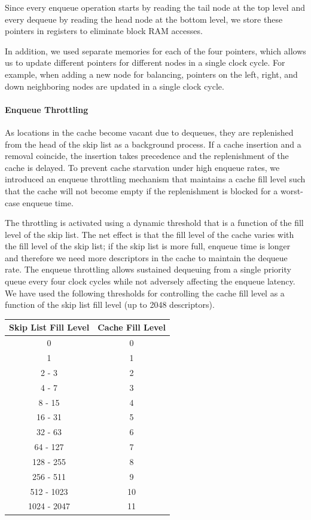 Since every enqueue operation starts by reading the tail node at the top level and every dequeue by reading the head node at the bottom level, we store these pointers in registers to eliminate block RAM accesses.

In addition, we used separate memories for each of the four pointers, which allows us to update different pointers for different nodes in a single clock cycle.  For example, when adding a new node for balancing, pointers on the left, right, and down neighboring nodes are updated in a single clock cycle.

\paragraph{Enqueue Throttling}\label{enq-throttle}
As locations in the cache become vacant due to dequeues, they are replenished from the head of the skip list as a background process.  If a cache insertion and a removal coincide, the insertion takes precedence and the replenishment of the cache is delayed.  To prevent cache starvation under high enqueue rates, we introduced an enqueue throttling mechanism that maintains a cache fill level such that the cache will not become empty if the replenishment is blocked for a worst-case enqueue time.  

The throttling is activated using a dynamic threshold that is a function of the fill level of the skip list.  The net effect is that the fill level of the cache varies with the fill level of the skip list; if the skip list is more full, enqueue time is longer and therefore we need more descriptors in the cache to maintain the dequeue rate.  The enqueue throttling allows sustained dequeuing from a single priority queue every four clock cycles while not adversely affecting the enqueue latency. We have used the following thresholds for controlling the cache fill level as a function of the skip list fill level (up to 2048 descriptors).

\begin{center}
\begin{tabular}{|c|c|}
    \hline
    \textbf{Skip List Fill Level} & \textbf{Cache Fill Level} \\
    \hline
    0 & 0\\
    \hline
    1 & 1\\
    \hline
    2 - 3 & 2\\
    \hline
    4 - 7 & 3\\
    \hline
    8 - 15 & 4\\
    \hline
    16 - 31 & 5\\
    \hline
    32 - 63 & 6\\
    \hline
    64 - 127 & 7\\
    \hline
    128 - 255 & 8\\
    \hline
    256 - 511 & 9\\
    \hline
    512 - 1023 & 10\\
    \hline
    1024 - 2047 & 11\\
    \hline
\end{tabular}
\end{center}

